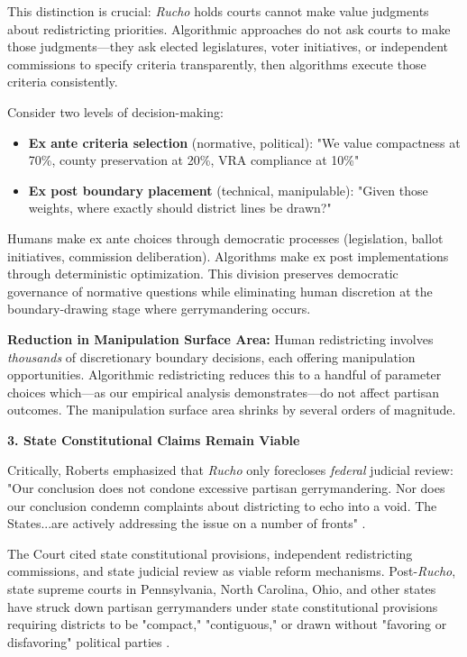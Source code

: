 This distinction is crucial: \textit{Rucho} holds courts cannot make value judgments about redistricting priorities. Algorithmic approaches do not ask courts to make those judgments—they ask elected legislatures, voter initiatives, or independent commissions to specify criteria transparently, then algorithms execute those criteria consistently.

Consider two levels of decision-making:
\begin{itemize}
\item \textbf{Ex ante criteria selection} (normative, political): "We value compactness at 70\%, county preservation at 20\%, VRA compliance at 10\%"
\item \textbf{Ex post boundary placement} (technical, manipulable): "Given those weights, where exactly should district lines be drawn?"
\end{itemize}

Humans make ex ante choices through democratic processes (legislation, ballot initiatives, commission deliberation). Algorithms make ex post implementations through deterministic optimization. This division preserves democratic governance of normative questions while eliminating human discretion at the boundary-drawing stage where gerrymandering occurs.

\textbf{Reduction in Manipulation Surface Area:} Human redistricting involves \textit{thousands} of discretionary boundary decisions, each offering manipulation opportunities. Algorithmic redistricting reduces this to a handful of parameter choices which—as our empirical analysis demonstrates—do not affect partisan outcomes. The manipulation surface area shrinks by several orders of magnitude.

\textbf{3. State Constitutional Claims Remain Viable}

Critically, Roberts emphasized that \textit{Rucho} only forecloses \textit{federal} judicial review: "Our conclusion does not condone excessive partisan gerrymandering. Nor does our conclusion condemn complaints about districting to echo into a void. The States...are actively addressing the issue on a number of fronts" \citep{rucho2019}.

The Court cited state constitutional provisions, independent redistricting commissions, and state judicial review as viable reform mechanisms. Post-\textit{Rucho}, state supreme courts in Pennsylvania, North Carolina, Ohio, and other states have struck down partisan gerrymanders under state constitutional provisions requiring districts to be "compact," "contiguous," or drawn without "favoring or disfavoring" political parties \citep{pennsylvania2018,northcarolina2022}.


